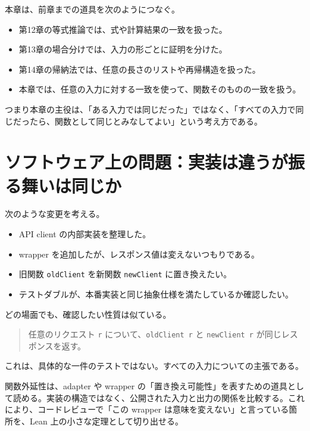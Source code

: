 
本章は、前章までの道具を次のようにつなぐ。

\begin{itemize}
\item 第12章の等式推論では、式や計算結果の一致を扱った。
\item 第13章の場合分けでは、入力の形ごとに証明を分けた。
\item 第14章の帰納法では、任意の長さのリストや再帰構造を扱った。
\item 本章では、任意の入力に対する一致を使って、関数そのものの一致を扱う。
\end{itemize}

つまり本章の主役は、「ある入力では同じだった」ではなく、「すべての入力で同じだったら、関数として同じとみなしてよい」という考え方である。

\section{ソフトウェア上の問題：実装は違うが振る舞いは同じか}

次のような変更を考える。

\begin{itemize}
\item API client の内部実装を整理した。
\item wrapper を追加したが、レスポンス値は変えないつもりである。
\item 旧関数 \texttt{oldClient} を新関数 \texttt{newClient} に置き換えたい。
\item テストダブルが、本番実装と同じ抽象仕様を満たしているか確認したい。
\end{itemize}

どの場面でも、確認したい性質は似ている。

\begin{quote}
任意のリクエスト \texttt{r} について、\texttt{oldClient r} と \texttt{newClient r} が同じレスポンスを返す。
\end{quote}

これは、具体的な一件のテストではない。すべての入力についての主張である。

\begin{softwarebox}
関数外延性は、adapter や wrapper の「置き換え可能性」を表すための道具として読める。実装の構造ではなく、公開された入力と出力の関係を比較する。これにより、コードレビューで「この wrapper は意味を変えない」と言っている箇所を、Lean 上の小さな定理として切り出せる。
\end{softwarebox}

